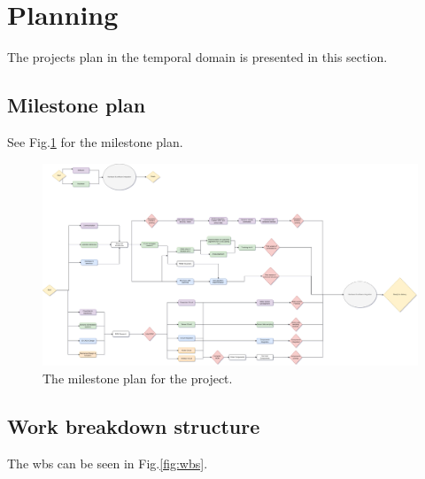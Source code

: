\section{Planning}
\label{section:planning}

The projects plan in the temporal domain is presented in this section.

\subsection{Milestone plan}

See Fig.\:\ref{fig:MileStone} for the milestone plan.

\begin{figure}
    \centering
    \includegraphics[width=\linewidth]{images/MileStone_for_PRO1.png}
    \caption{The milestone plan for the project.}
    \label{fig:MileStone} 
\end{figure}



\subsection{Work breakdown structure}

The \ac{wbs} can be seen in Fig.\:\ref{fig:wbs}.


